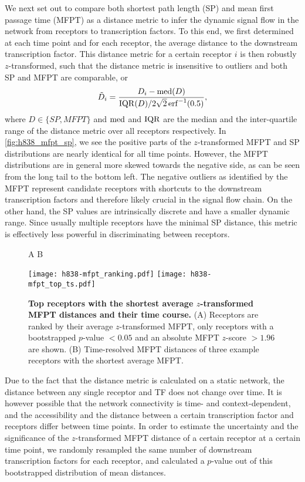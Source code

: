 We next set out to compare both shortest path length (SP) and mean first 
passage time (MFPT) as a distance metric to infer the dynamic signal flow
in the network from receptors to transcription factors. To this end, we
first determined at each time point and for each receptor, 
the average distance to the downstream transcription 
factor. This distance metric for a certain receptor
$i$ is then robustly $z$-transformed, such that the distance
metric is insensitive to outliers and both SP and MFPT 
are comparable, or
\[
\tilde{D}_{i} = \frac{D_{i}-\operatorname{med}(D)}{\operatorname{IQR}(D)/2\sqrt{2}\operatorname{erf}^{-1}(0.5)}, 
\]
where $D \in \{SP,MFPT\}$ and $\operatorname{med}$ and $\operatorname{IQR}$ are the median 
and 
the inter-quartile range of the distance metric over all 
receptors 
respectively. In \ref{fig:h838_mfpt_sp}, we see the positive
parts of the $z$-transformed MFPT and SP distributions are
nearly identical for all time points. However, the 
MFPT distributions are in general more skewed towards the
negative side, as can be seen from the long tail to the 
bottom left. The negative outliers as identified by the MFPT
represent candidate receptors with shortcuts to the
downstream transcription factors and therefore likely crucial in the signal
flow chain. On the other hand, the SP values are intrinsically discrete and have a smaller dynamic range. Since usually 
multiple receptors have
the minimal SP distance, this metric is effectively less powerful in
discriminating between receptors.

\begin{figure}[!ht]
\hskip 0.5in A \hskip 2.5in B
\begin{center}
\texttt{[image: h838-mfpt\_ranking.pdf]}
\texttt{[image: h838-mfpt\_top\_ts.pdf]}
\end{center}
\caption[Top receptors identified by MFPT]{
{\bf Top receptors with the shortest average $z$-transformed MFPT distances and their time course.} 
(A) Receptors are ranked by their average $z$-transformed
MFPT, only receptors with a bootstrapped $p$-value $<0.05$
and an absolute MFPT $z$-score $>1.96$ are shown.
(B) Time-resolved MFPT distances of three example receptors 
with the shortest average MFPT.
}
\label{fig:h838_mfpt_ts}
\end{figure}

Due to the fact that the distance metric is calculated on a static network, the distance between any single receptor and TF does not change over time. It is however possible that
the network connectivity is time- and context-dependent, 
and the accessibility and the distance between a certain transcription factor
and receptors differ between time points.
In order to estimate the uncertainty and the significance of the $z$-transformed 
MFPT distance of a certain receptor at a certain time point, 
we randomly resampled the same number of downstream
transcription factors for each receptor, and calculated a
$p$-value out of this bootstrapped distribution of mean 
distances.

